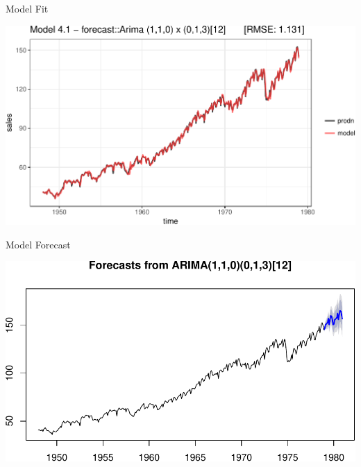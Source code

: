 \documentclass[11pt,ignorenonframetext,]{beamer}
\newenvironment{Shaded}{}{}
\newcommand{\FloatTok}[1]{\textcolor[rgb]{0.25,0.63,0.44}{#1}}
\newcommand{\KeywordTok}[1]{\textcolor[rgb]{0.00,0.44,0.13}{\textbf{#1}}}
\newcommand{\NormalTok}[1]{#1}
\newcommand{\OperatorTok}[1]{\textcolor[rgb]{0.40,0.40,0.40}{#1}}
\newcommand{\StringTok}[1]{\textcolor[rgb]{0.25,0.44,0.63}{#1}}
\let\oldShaded\Shaded
\let\endoldShaded\endShaded
\renewenvironment{Shaded}{\footnotesize\begin{spacing}{0.9}\oldShaded}{\endoldShaded\end{spacing}}
\begin{document}
\begin{frame}{%
\protect\hypertarget{model-fit}{%
Model Fit}}

\begin{center}\includegraphics[width=\textwidth]{Lec11_files/figure-beamer/unnamed-chunk-28-1} \end{center}

\end{frame}

\begin{frame}[fragile]{%
\protect\hypertarget{model-forecast}{%
Model Forecast}}

\begin{Shaded}
\end{Shaded}

\begin{center}\includegraphics[width=\textwidth]{Lec11_files/figure-beamer/unnamed-chunk-29-1} \end{center}

\end{frame}
\end{document}
